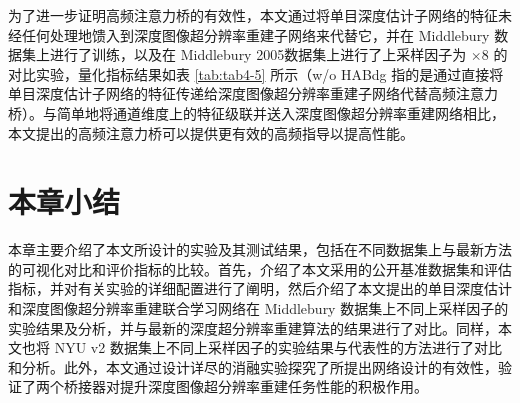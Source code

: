 为了进一步证明高频注意力桥的有效性，本文通过将单目深度估计子网络的特征未经任何处理地馈入到深度图像超分辨率重建子网络来代替它，并在 Middlebury 数据集上进行了训练，以及在 Middlebury 2005数据集上进行了上采样因子为 $\times 8$ 的对比实验，量化指标结果如表 \ref{tab:tab4-5} 所示（w/o HABdg 指的是通过直接将单目深度估计子网络的特征传递给深度图像超分辨率重建子网络代替高频注意力桥）。与简单地将通道维度上的特征级联并送入深度图像超分辨率重建网络相比，本文提出的高频注意力桥可以提供更有效的高频指导以提高性能。

\begin{table}[]
\caption{针对高频注意力桥的消融研究量化对比}
\label{tab:tab4-5}
\end{table}

\section{本章小结}

本章主要介绍了本文所设计的实验及其测试结果，包括在不同数据集上与最新方法的可视化对比和评价指标的比较。首先，介绍了本文采用的公开基准数据集和评估指标，并对有关实验的详细配置进行了阐明，然后介绍了本文提出的单目深度估计和深度图像超分辨率重建联合学习网络在 Middlebury 数据集上不同上采样因子的实验结果及分析，并与最新的深度超分辨率重建算法的结果进行了对比。同样，本文也将 NYU v2 数据集上不同上采样因子的实验结果与代表性的方法进行了对比和分析。此外，本文通过设计详尽的消融实验探究了所提出网络设计的有效性，验证了两个桥接器对提升深度图像超分辨率重建任务性能的积极作用。
